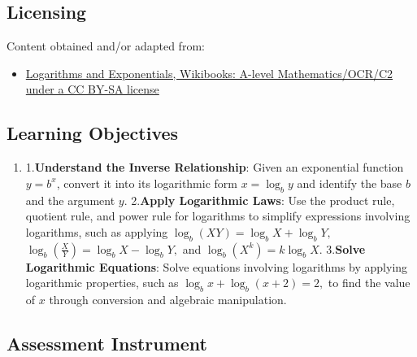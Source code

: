 \subsection{Licensing}
\label{sss:lice-7352}

Content obtained and/or adapted from:

\begin{itemize}
    \item \href{https://en.wikibooks.org/wiki/A-level_Mathematics/OCR/C2/Logarithms_and_Exponentials}{Logarithms and Exponentials, Wikibooks: A-level Mathematics/OCR/C2 under a CC BY-SA license}
\end{itemize}

\subsection{Learning Objectives}
\label{ssec:lear-6683}

\begin{enumerate}
    \item 1.\textbf{Understand the Inverse Relationship}: Given an exponential function $y = b^x$, convert it into its logarithmic form $x = \log_b y$ and identify the base $b$ and the argument $y$. 2.\textbf{Apply Logarithmic Laws}: Use the product rule, quotient rule, and power rule for logarithms to simplify expressions involving logarithms, such as applying $ \log_b (XY) = \log_b X + \log_b Y, $ $ \log_b \left(\frac{X}{Y}\right) = \log_b X - \log_b Y, $ and $ \log_b (X^k) = k \log_b X. $ 3.\textbf{Solve Logarithmic Equations}: Solve equations involving logarithms by applying logarithmic properties, such as $ \log_b x + \log_b (x + 2) = 2, $ to find the value of $x$ through conversion and algebraic manipulation.
\end{enumerate}

\subsection{Assessment Instrument}
\label{ssec:asse-1f50}

